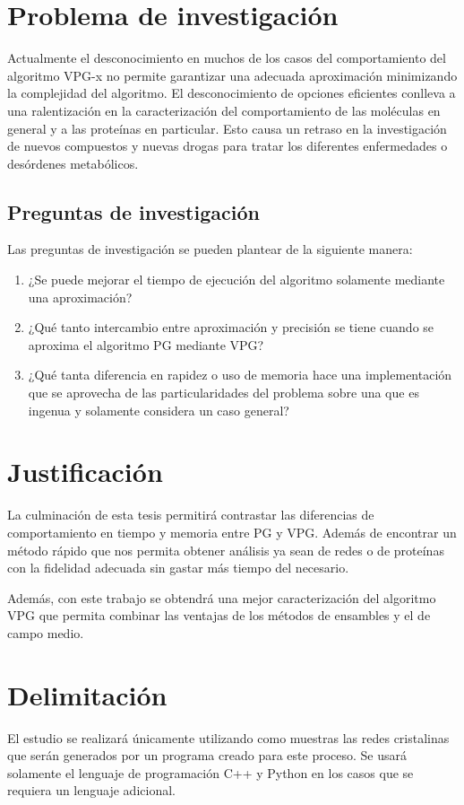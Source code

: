 \section{Problema de investigación}
Actualmente el desconocimiento en muchos de los casos del comportamiento del algoritmo VPG-x no permite garantizar una adecuada aproximación minimizando la complejidad del algoritmo. El desconocimiento de opciones eficientes conlleva a una ralentización en la caracterización del comportamiento de las moléculas en general y a las proteínas en particular.  Esto causa un retraso en la investigación de nuevos compuestos y nuevas drogas para tratar los diferentes enfermedades o desórdenes metabólicos.

\subsection*{Preguntas de investigación}
Las preguntas de investigación se pueden plantear de la siguiente manera:
\begin{enumerate}
	\item ¿Se puede mejorar el tiempo de ejecución del algoritmo solamente mediante una aproximación?
	\item ¿Qué tanto intercambio entre aproximación y precisión se tiene cuando se aproxima el algoritmo PG mediante VPG?
	\item ¿Qué tanta diferencia en rapidez o uso de memoria hace una implementación que se aprovecha de las particularidades del problema sobre una que es ingenua y solamente considera un caso general?
\end{enumerate}

\section{Justificación}
La culminación de esta tesis permitirá contrastar las diferencias de comportamiento en tiempo y memoria entre PG y VPG. Además de encontrar un método rápido que nos permita obtener análisis ya sean de redes o de proteínas con la fidelidad adecuada sin gastar más tiempo del necesario.

Además, con este trabajo se obtendrá una mejor caracterización del algoritmo VPG que permita combinar las ventajas de los métodos de ensambles y el de campo medio.

\section{Delimitación}
El estudio se realizará únicamente utilizando como muestras las redes cristalinas que serán generados por un programa creado para este proceso. Se usará solamente el lenguaje de programación C++ y Python en los casos que se requiera un lenguaje adicional.

